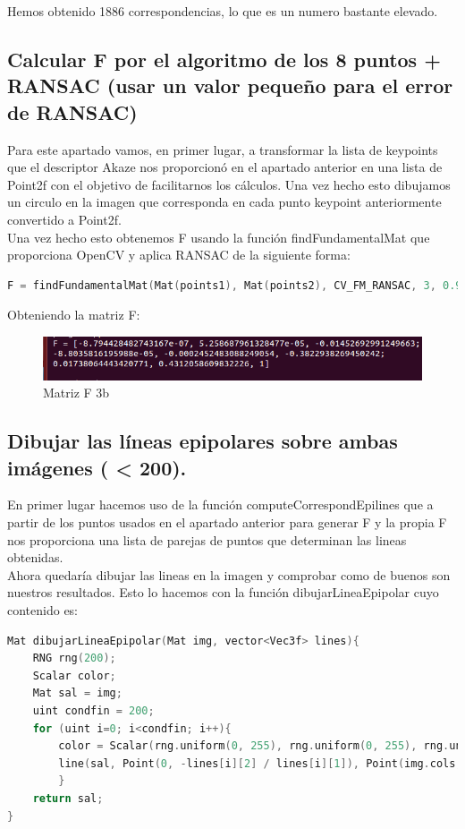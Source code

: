 Hemos obtenido 1886 correspondencias, lo que es un numero bastante elevado.

\subsection{Calcular F por el algoritmo de los 8 puntos + RANSAC (usar un valor pequeño para el error de RANSAC)}

Para este apartado vamos, en primer lugar, a transformar la lista de keypoints que el descriptor Akaze nos proporcionó en el apartado anterior en una lista de Point2f con el objetivo de facilitarnos los cálculos. Una vez hecho esto dibujamos un circulo en la imagen que corresponda en cada punto keypoint anteriormente convertido a Point2f.\\

Una vez hecho esto obtenemos F usando la función findFundamentalMat que proporciona OpenCV y aplica RANSAC de la siguiente forma:

\begin{lstlisting}[language=C]
	F = findFundamentalMat(Mat(points1), Mat(points2), CV_FM_RANSAC, 3, 0.999);
\end{lstlisting}

Obteniendo la matriz F:

\begin{figure}[H]
	\centering
	\includegraphics[width=0.9\linewidth]{funcionF3b}
	\caption{Matriz F 3b}
\end{figure}

\subsection{Dibujar las líneas epipolares sobre ambas imágenes ( < 200).}

En primer lugar hacemos uso de la función computeCorrespondEpilines que a partir de los puntos usados en el apartado anterior para generar F y la propia F nos proporciona una lista de parejas de puntos que determinan las lineas obtenidas.\\

Ahora quedaría dibujar las lineas en la imagen y comprobar como de buenos son nuestros resultados. Esto lo hacemos con la función dibujarLineaEpipolar cuyo contenido es:

\begin{lstlisting}[language=C]
Mat dibujarLineaEpipolar(Mat img, vector<Vec3f> lines){
	RNG rng(200);
	Scalar color;
	Mat sal = img;
	uint condfin = 200;
	for (uint i=0; i<condfin; i++){
		color = Scalar(rng.uniform(0, 255), rng.uniform(0, 255), rng.uniform(0, 255));
		line(sal, Point(0, -lines[i][2] / lines[i][1]), Point(img.cols, -(lines[i][2] + lines[i][0] * img.cols) / lines[i][1]), color);
		}
	return sal;
}
\end{lstlisting}

